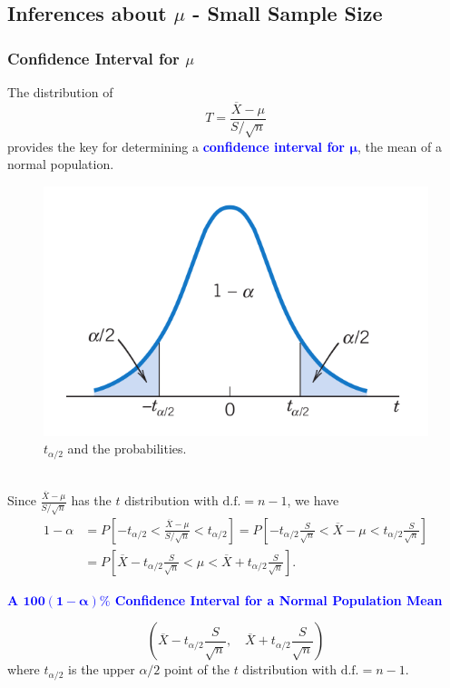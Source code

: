 \documentclass[12pt,a4paper]{article}
\newcommand{\dispsty}{\displaystyle}
\newcommand{\df}{\text{d.f.}}
\begin{document}
\subsection{Inferences about $\mu$ - Small Sample Size}
\subsubsection{Confidence Interval for $\mu$}
The distribution of \[
T=\frac{\overline{X}-\mu}{S/\sqrt{n}}
\] provides the key for determining a \textcolor{blue}{\bf confidence interval for $\boldsymbol{\mu}$}, the mean of a normal population. \begin{figure}[h!]
	\centering
	\includegraphics[scale=.3]{931.png}
	\caption{$t_{\alpha/2}$ and the probabilities.}
\end{figure}\
\\ Since $\dispsty\frac{\overline{X}-\mu}{S/\sqrt{n}}$ has the $t$ distribution with $\df = n-1$, we have \begin{align*}
1-\alpha &= P\left[-t_{\alpha/2}<\frac{\overline{X}-\mu}{S/\sqrt{n}}<t_{\alpha/2} \right] = P\left[-t_{\alpha/2}\frac{S}{\sqrt{n}}<\overline{X}-\mu<t_{\alpha/2}\frac{S}{\sqrt{n}} \right] \\
&= P\left[\overline{X}-t_{\alpha/2}\frac{S}{\sqrt{n}}<\mu<\overline{X}+t_{\alpha/2}\frac{S}{\sqrt{n}} \right].
\end{align*}
\begin{tcolorbox}[colback=white]\begin{center}
		\textcolor{blue}{\bf A $\boldsymbol{100(1-\alpha)\%}$ Confidence Interval for a Normal Population Mean}
	\end{center}\[
\left(\overline{X}-t_{\alpha/2}\frac{S}{\sqrt{n}},\quad \overline{X}+t_{\alpha/2}\frac{S}{\sqrt{n}}\right)
\] where $t_{\alpha/2}$ is the upper $\alpha/2$ point of the $t$ distribution with $\df=n-1$.
\end{tcolorbox}
\end{document}
